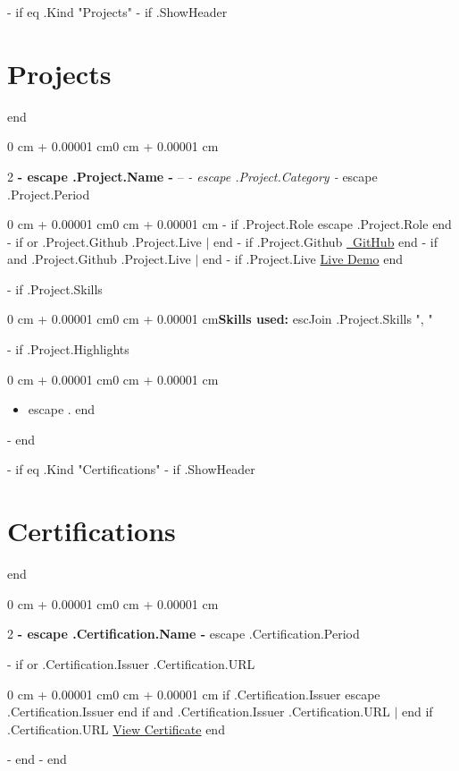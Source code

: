 \documentclass[10pt, letterpaper]{article}
\newenvironment{highlights}{\begin{itemize}[topsep=0.10 cm,parsep=0.10 cm,partopsep=0pt,itemsep=0pt,leftmargin=0 cm + 10pt]}{\end{itemize}}
\newenvironment{onecolentry}{\begin{adjustwidth}{0 cm + 0.00001 cm}{0 cm + 0.00001 cm}}{\end{adjustwidth}}
\newenvironment{twocolentry}[2][]{\onecolentry\def\secondColumn{#2}\setcolumnwidth{\fill, 4.5 cm}\begin{paracol}{2}}{\switchcolumn \raggedleft \secondColumn\end{paracol}\endonecolentry}
\begin{document}
        {{- if eq .Kind "Projects" }}
            {{- if .ShowHeader }}\section{Projects}{{ end }}
            \begin{twocolentry}{
                {{ escape .Project.Period }}
            }
                \textbf{ {{- escape .Project.Name -}} } -- \textit{ {{- escape .Project.Category -}} }\end{twocolentry}
            \vspace{0.10 cm}
            \begin{onecolentry}
                {{- if .Project.Role }}{{ escape .Project.Role }}{{ end }}
                {{- if or .Project.Github .Project.Live }} $|$ {{ end }}
                {{- if .Project.Github }}\href{ {{ .Project.Github }} }{\faGithub\ GitHub}{{ end }}
                {{- if and .Project.Github .Project.Live }} $|$ {{ end }}
                {{- if .Project.Live }}\href{ {{ .Project.Live }} }{Live Demo}{{ end }}
            \end{onecolentry}
            {{- if .Project.Skills }}\vspace{0.10 cm}\begin{onecolentry}\textbf{Skills used:} {{ escJoin .Project.Skills ", " }}\end{onecolentry}{{ end }}
            {{- if .Project.Highlights }}\vspace{0.10 cm}\begin{onecolentry}\begin{highlights}{{ range .Project.Highlights }}\item {{ escape . }}{{ end }}\end{highlights}\end{onecolentry}{{ end }}
            \vspace{0.2 cm}
        {{- end }}

        {{- if eq .Kind "Certifications" }}
            {{- if .ShowHeader }}\section{Certifications}{{ end }}
            \begin{twocolentry}{
                {{ escape .Certification.Period }}
            }
                \textbf{ {{- escape .Certification.Name -}} }\end{twocolentry}
            {{- if or .Certification.Issuer .Certification.URL }}\vspace{0.10 cm}\begin{onecolentry}{{ if .Certification.Issuer }}{{ escape .Certification.Issuer }}{{ end }} {{ if and .Certification.Issuer .Certification.URL }} $|$ {{ end }} {{ if .Certification.URL }}\href{ {{ .Certification.URL }} }{View Certificate}{{ end }}\end{onecolentry}{{ end }}
            \vspace{0.2 cm}
        {{- end }}
    {{- end }}
\end{document}
